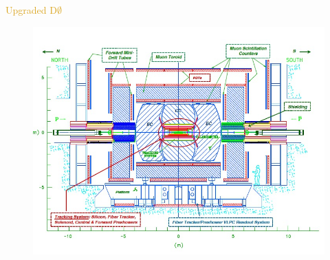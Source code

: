 \begin{frame}{\textcolor{Goldenrod}{Upgraded D$\emptyset$}}
  \begin{figure}[h]
    \includegraphics[width=0.95\linewidth]{./Images/02_D0_layout}%
  \end{figure}
\end{frame}

